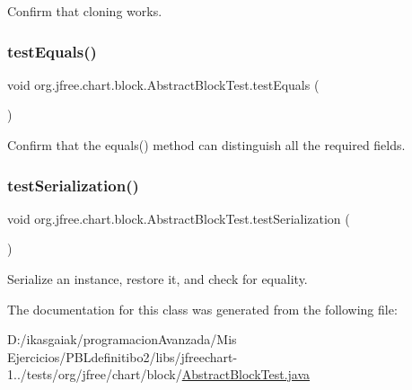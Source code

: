 Confirm that cloning works. \mbox{\label{classorg_1_1jfree_1_1chart_1_1block_1_1_abstract_block_test_a5be20177d48730248d4a346158c84f9c}} 
\subsubsection{\texorpdfstring{test\+Equals()}{testEquals()}}
{\footnotesize\ttfamily void org.\+jfree.\+chart.\+block.\+Abstract\+Block\+Test.\+test\+Equals (\begin{DoxyParamCaption}{ }\end{DoxyParamCaption})}

Confirm that the equals() method can distinguish all the required fields. \mbox{\label{classorg_1_1jfree_1_1chart_1_1block_1_1_abstract_block_test_abcc0ab6ecedda41450c589b738e7a242}} 
\subsubsection{\texorpdfstring{test\+Serialization()}{testSerialization()}}
{\footnotesize\ttfamily void org.\+jfree.\+chart.\+block.\+Abstract\+Block\+Test.\+test\+Serialization (\begin{DoxyParamCaption}{ }\end{DoxyParamCaption})}

Serialize an instance, restore it, and check for equality. 

The documentation for this class was generated from the following file\+:\begin{DoxyCompactItemize}
\item 
D\+:/ikasgaiak/programacion\+Avanzada/\+Mis Ejercicios/\+P\+B\+Ldefinitibo2/libs/jfreechart-\/1../tests/org/jfree/chart/block/\mbox{\hyperlink{_abstract_block_test_8java}{Abstract\+Block\+Test.\+java}}\end{DoxyCompactItemize}
